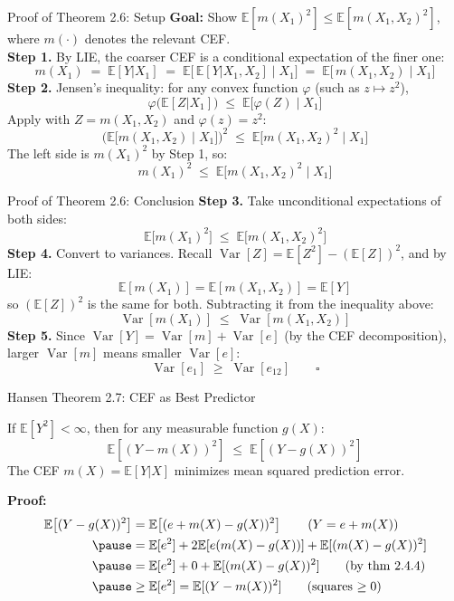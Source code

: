 \documentclass[aspectratio=169, handout, t]{beamer}
\numberwithin{equation}{section}
\begin{document}
\begin{frame}{Proof of Theorem 2.6: Setup}
\textbf{Goal:} Show $\mathbb{E}[m(X_1)^2] \leq \mathbb{E}[m(X_1,X_2)^2]$, where $m(\cdot)$ denotes the relevant CEF.\\ \medskip\pause
\textbf{Step 1.} By LIE, the coarser CEF is a conditional expectation of the finer one:
$$m(X_1) \;=\; \mathbb{E}[Y|X_1] \;=\; \mathbb{E}\!\big[\,\mathbb{E}[Y|X_1,X_2]\;\big|\;X_1\big] \;=\; \mathbb{E}\!\big[\,m(X_1,X_2)\;\big|\;X_1\big]$$
\pause
\textbf{Step 2.} Jensen's inequality: for any convex function $\varphi$ (such as $z\mapsto z^2$),
$$\varphi\!\big(\mathbb{E}[Z|X_1]\big) \;\leq\; \mathbb{E}\!\big[\varphi(Z)\;\big|\;X_1\big]$$
\pause
Apply with $Z = m(X_1,X_2)$ and $\varphi(z)=z^2$:
$$\Big(\mathbb{E}\!\big[m(X_1,X_2)\;\big|\;X_1\big]\Big)^{\!2} \;\leq\; \mathbb{E}\!\big[m(X_1,X_2)^2\;\big|\;X_1\big]$$
\pause
The left side is $m(X_1)^2$ by Step 1, so:
$$m(X_1)^2 \;\leq\; \mathbb{E}\!\big[m(X_1,X_2)^2\;\big|\;X_1\big]$$
\end{frame}

\begin{frame}{Proof of Theorem 2.6: Conclusion}
\textbf{Step 3.} Take unconditional expectations of both sides:
$$\mathbb{E}\!\big[m(X_1)^2\big] \;\leq\; \mathbb{E}\!\big[m(X_1,X_2)^2\big]$$
\pause
\textbf{Step 4.} Convert to variances. Recall $\operatorname{Var}[Z]=\mathbb{E}[Z^2]-(\mathbb{E}[Z])^2$, and by LIE:
$$\mathbb{E}[m(X_1)]=\mathbb{E}[m(X_1,X_2)]=\mathbb{E}[Y]$$
so $(\mathbb{E}[Z])^2$ is the same for both.  Subtracting it from the inequality above:
$$\operatorname{Var}[m(X_1)] \;\leq\; \operatorname{Var}[m(X_1,X_2)]$$
\pause
\textbf{Step 5.} Since $\operatorname{Var}[Y]=\operatorname{Var}[m]+\operatorname{Var}[e]$ (by the CEF decomposition), larger $\operatorname{Var}[m]$ means smaller $\operatorname{Var}[e]$:
$$\operatorname{Var}[e_1] \;\geq\; \operatorname{Var}[e_{12}] \qquad \square$$
\end{frame}


\begin{frame}{Hansen Theorem 2.7: CEF as Best Predictor}
\begin{tcolorbox}[colback=blue!5, colframe=blue!50, title=Theorem 2.7 (CEF Is the Best Predictor)]
If $\mathbb{E}[Y^2]<\infty$, then for any measurable function $g(X)$:
$$\mathbb{E}\!\left[(Y-m(X))^2\right] \;\leq\; \mathbb{E}\!\left[(Y-g(X))^2\right]$$
The CEF $m(X)=\mathbb{E}[Y|X]$ minimizes mean squared prediction error.
\end{tcolorbox}
\vspace{-2pt}
{\small\textbf{Proof:}}\pause
{\footnotesize
\begin{align*}
\mathbb{E}\!\left[(Y-g(X))^2\right]&=\mathbb{E}\!\left[(e+m(X)-g(X))^2\right] \tag{$Y= e+m(X)$}\\ \pause
&=\mathbb{E}[e^2]+2\mathbb{E}[e(m(X)-g(X))]+\mathbb{E}[(m(X)-g(X))^2]\\\pause
 &=\mathbb{E}[e^2]+0+\mathbb{E}[(m(X)-g(X))^2] \tag{by thm 2.4.4}\\\pause
  &\geq \mathbb{E}[e^2] = \mathbb{E}[(Y-m(X))^2] \tag{squares $\geq 0$}
 \end{align*}}
\end{frame}
\end{document}
